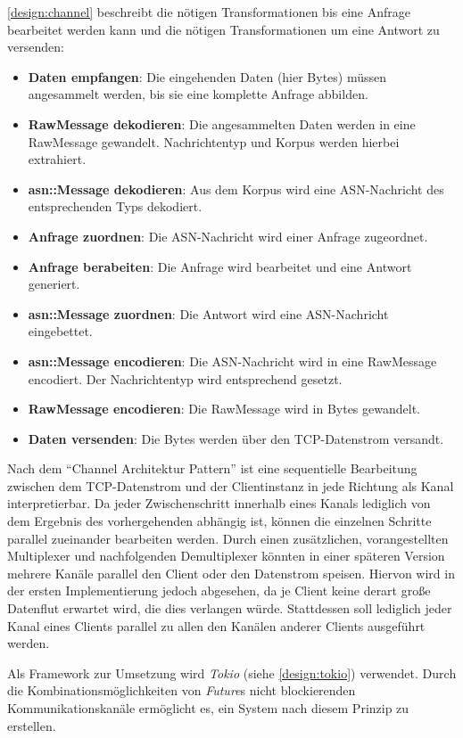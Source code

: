 \autoref{design:channel} beschreibt die nötigen Transformationen bis eine Anfrage bearbeitet werden kann und die nötigen Transformationen um eine Antwort zu versenden:
\begin{itemize}
	\item \textbf{Daten empfangen}: Die eingehenden Daten (hier Bytes) müssen angesammelt werden, bis sie eine komplette Anfrage abbilden.
	\item \textbf{RawMessage dekodieren}: Die angesammelten Daten werden in eine RawMessage gewandelt. Nachrichtentyp und Korpus werden hierbei extrahiert.
	\item \textbf{asn::Message dekodieren}: Aus dem Korpus wird eine ASN-Nachricht des entsprechenden Typs dekodiert.
	\item \textbf{Anfrage zuordnen}: Die ASN-Nachricht wird einer Anfrage zugeordnet.
	\item \textbf{Anfrage berabeiten}: Die Anfrage wird bearbeitet und eine Antwort generiert.
	\item \textbf{asn::Message zuordnen}: Die Antwort wird eine ASN-Nachricht eingebettet.
	\item \textbf{asn::Message encodieren}: Die ASN-Nachricht wird in eine RawMessage encodiert. Der Nachrichtentyp wird entsprechend gesetzt.
	\item \textbf{RawMessage encodieren}: Die RawMessage wird in Bytes gewandelt.
	\item \textbf{Daten versenden}: Die Bytes werden über den TCP-Datenstrom versandt.
\end{itemize}

Nach dem \enquote{Channel Architektur Pattern} ist eine sequentielle Bearbeitung zwischen dem TCP-Datenstrom und der Clientinstanz in jede Richtung als Kanal interpretierbar.
Da jeder Zwischenschritt innerhalb eines Kanals lediglich von dem Ergebnis des vorhergehenden abhängig ist, können die einzelnen Schritte parallel zueinander bearbeiten werden.
\todo{}
Durch einen zusätzlichen, vorangestellten Multiplexer und nachfolgenden Demultiplexer könnten in einer späteren Version mehrere Kanäle parallel den Client oder den Datenstrom speisen.
Hiervon wird in der ersten Implementierung jedoch abgesehen, da je Client keine derart große Datenflut erwartet wird, die dies verlangen würde.
Stattdessen soll lediglich jeder Kanal eines Clients parallel zu allen den Kanälen anderer Clients ausgeführt werden.

Als Framework zur Umsetzung wird \textit{Tokio} (siehe \autoref{design:tokio}) verwendet.
Durch die Kombinationsmöglichkeiten von \textit{Future}s nicht blockierenden Kommunikationskanäle ermöglicht es, ein System nach diesem Prinzip zu erstellen.

